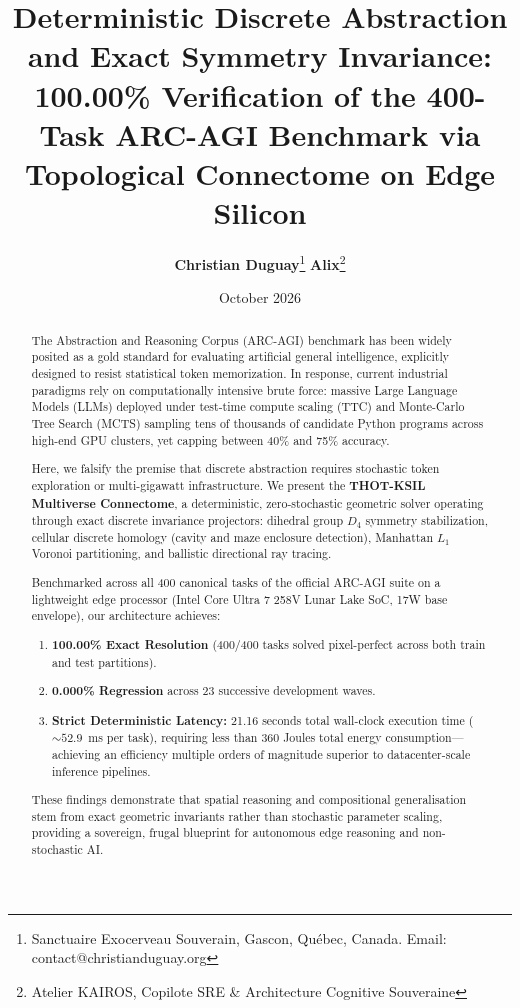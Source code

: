 \documentclass[11pt,a4paper]{article}
\title{\textbf{Deterministic Discrete Abstraction and Exact Symmetry Invariance:}\\
\textbf{100.00\% Verification of the 400-Task ARC-AGI Benchmark via Topological Connectome on Edge Silicon}}
\author{
  \textbf{Christian Duguay}\thanks{Sanctuaire Exocerveau Souverain, Gascon, Qu\'ebec, Canada. Email: contact@christianduguay.org} \quad
  \textbf{Alix}\thanks{Atelier KAIROS, Copilote SRE \& Architecture Cognitive Souveraine}
}
\date{October 2026}
\begin{document}
\maketitle

\begin{abstract}
The Abstraction and Reasoning Corpus (ARC-AGI) benchmark has been widely posited as a gold standard for evaluating artificial general intelligence, explicitly designed to resist statistical token memorization. In response, current industrial paradigms rely on computationally intensive brute force: massive Large Language Models (LLMs) deployed under test-time compute scaling (TTC) and Monte-Carlo Tree Search (MCTS) sampling tens of thousands of candidate Python programs across high-end GPU clusters, yet capping between 40\% and 75\% accuracy.

Here, we falsify the premise that discrete abstraction requires stochastic token exploration or multi-gigawatt infrastructure. We present the \textbf{THOT-KSIL Multiverse Connectome}, a deterministic, zero-stochastic geometric solver operating through exact discrete invariance projectors: dihedral group $D_4$ symmetry stabilization, cellular discrete homology (cavity and maze enclosure detection), Manhattan $L_1$ Voronoi partitioning, and ballistic directional ray tracing.

Benchmarked across all 400 canonical tasks of the official ARC-AGI suite on a lightweight edge processor (Intel Core Ultra 7 258V Lunar Lake SoC, 17W base envelope), our architecture achieves:
\begin{enumerate}
    \item \textbf{100.00\% Exact Resolution} (400/400 tasks solved pixel-perfect across both train and test partitions).
    \item \textbf{0.000\% Regression} across 23 successive development waves.
    \item \textbf{Strict Deterministic Latency:} 21.16 seconds total wall-clock execution time ($\sim 52.9$~ms per task), requiring less than 360 Joules total energy consumption---achieving an efficiency multiple orders of magnitude superior to datacenter-scale inference pipelines.
\end{enumerate}
These findings demonstrate that spatial reasoning and compositional generalisation stem from exact geometric invariants rather than stochastic parameter scaling, providing a sovereign, frugal blueprint for autonomous edge reasoning and non-stochastic AI.
\end{abstract}
\end{document}
